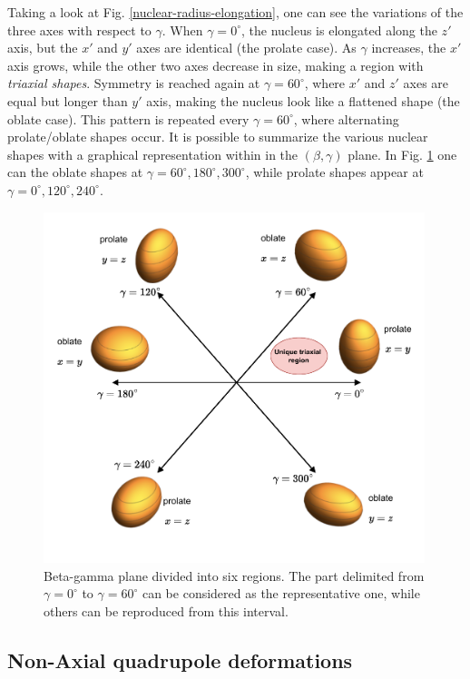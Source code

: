 Taking a look at Fig. \ref{nuclear-radius-elongation}, one can see the variations of the three axes with respect to $\gamma$. When $\gamma=0^\circ$, the nucleus is elongated along the $z'$ axis, but the $x'$ and $y'$ axes are identical (the prolate case). As $\gamma$ increases, the $x'$ axis grows, while the other two axes decrease in size, making a region with \emph{triaxial shapes}. Symmetry is reached again at $\gamma=60^\circ$, where $x'$ and $z'$ axes are equal but longer than $y'$ axis, making the nucleus look like a flattened shape (the oblate case). This pattern is repeated every $\gamma=60^\circ$, where alternating prolate/oblate shapes occur. It is possible to summarize the various nuclear shapes with a graphical representation within in the $(\beta,\gamma)$ plane. In Fig. \ref{beta-gamma-plane} one can the oblate shapes at $\gamma=60^\circ,180^\circ,300^\circ$, while prolate shapes appear at $\gamma=0^\circ,120^\circ,240^\circ$.
\begin{figure}
    \centering
    \includegraphics[width=0.99\textwidth]{Chapters/Figures/beta_gamma_plane.pdf}
    \caption{Beta-gamma plane divided into six regions. The part delimited from $\gamma=0^\circ$ to $\gamma=60^\circ$ can be considered as the representative one, while others can be reproduced from this interval.}
    \label{beta-gamma-plane}
\end{figure}

\subsection{Non-Axial quadrupole deformations}

